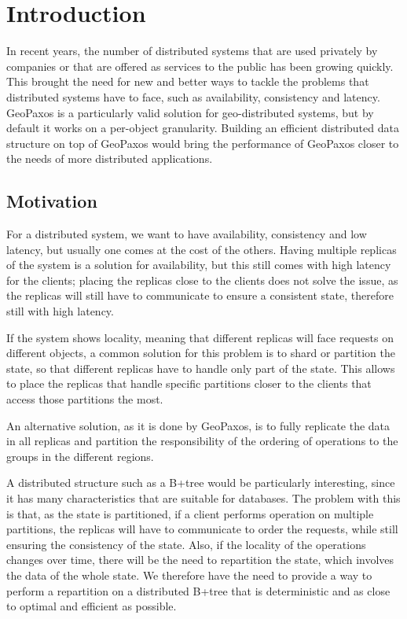 \chapter{Introduction}\label{sec:introduction}
In recent years, the number of distributed systems that are used privately by companies or that are offered as services to the public has been growing quickly. This brought the need for new and better ways to tackle the problems that distributed systems have to face, such as availability, consistency and latency. GeoPaxos\citep{geopaxos} is a particularly valid solution for geo-distributed systems, but by default it works on a per-object granularity. Building an efficient distributed data structure on top of GeoPaxos would bring the performance of GeoPaxos closer to the needs of more distributed applications.

\section{Motivation}\label{sec:motivation}
For a distributed system, we want to have availability, consistency and low latency, but usually one comes at the cost of the others. Having multiple replicas of the system is a solution for availability, but this still comes with high latency for the clients; placing the replicas close to the clients does not solve the issue, as the replicas will still have to communicate to ensure a consistent state, therefore still with high latency.

If the system shows locality, meaning that different replicas will face requests on different objects, a common solution for this problem is to shard or partition the state, so that different replicas have to handle only part of the state. This allows to place the replicas that handle specific partitions closer to the clients that access those partitions the most.

An alternative solution, as it is done by GeoPaxos\citep{geopaxos}, is to fully replicate the data in all replicas and partition the responsibility of the ordering of operations to the groups in the different regions.

A distributed structure such as a B+tree would be particularly interesting, since it has many characteristics that are suitable for databases. The problem with this is that, as the state is partitioned, if a client performs operation on multiple partitions, the replicas will have to communicate to order the requests, while still ensuring the consistency of the state. Also, if the locality of the operations changes over time, there will be the need to repartition the state, which involves the data of the whole state. We therefore have the need to provide a way to perform a repartition on a distributed B+tree that is deterministic and as close to optimal and efficient as possible.

